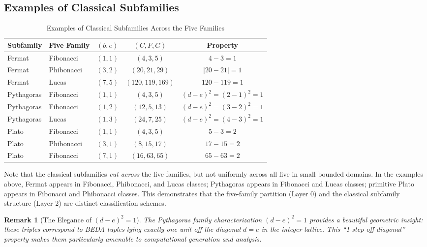 \documentclass[12pt]{article}
\newtheorem{remark}{Remark}
\begin{document}
\subsection{Examples of Classical Subfamilies}

\begin{table}[h!]
\centering
\caption{Examples of Classical Subfamilies Across the Five Families}
\label{tab:classical_examples}
\small
\begin{tabular}{llccc}
\toprule
\textbf{Subfamily} & \textbf{Five Family} & \textbf{$(b,e)$} & \textbf{$(C,F,G)$} & \textbf{Property} \\
\midrule
Fermat & Fibonacci & $(1,1)$ & $(4,3,5)$ & $4-3=1$ \\
Fermat & Phibonacci & $(3,2)$ & $(20,21,29)$ & $|20-21|=1$ \\
Fermat & Lucas & $(7,5)$ & $(120,119,169)$ & $120-119=1$ \\
Pythagoras & Fibonacci & $(1,1)$ & $(4,3,5)$ & $(d-e)^2=(2-1)^2=1$ \\
Pythagoras & Fibonacci & $(1,2)$ & $(12,5,13)$ & $(d-e)^2=(3-2)^2=1$ \\
Pythagoras & Lucas & $(1,3)$ & $(24,7,25)$ & $(d-e)^2=(4-3)^2=1$ \\
Plato & Fibonacci & $(1,1)$ & $(4,3,5)$ & $5-3=2$ \\
Plato & Phibonacci & $(3,1)$ & $(8,15,17)$ & $17-15=2$ \\
Plato & Fibonacci & $(7,1)$ & $(16,63,65)$ & $65-63=2$ \\
\bottomrule
\end{tabular}
\end{table}

Note that the classical subfamilies \emph{cut across} the five families, but not uniformly across all five in small bounded domains. In the examples above, Fermat appears in Fibonacci, Phibonacci, and Lucas classes; Pythagoras appears in Fibonacci and Lucas classes; primitive Plato appears in Fibonacci and Phibonacci classes. This demonstrates that the five-family partition (Layer 0) and the classical subfamily structure (Layer 2) are distinct classification schemes.

\begin{remark}[The Elegance of $(d-e)^2=1$]
The Pythagoras family characterization $(d-e)^2 = 1$ provides a beautiful geometric insight: these triples correspond to BEDA tuples lying exactly one unit off the diagonal $d = e$ in the integer lattice. This ``1-step-off-diagonal'' property makes them particularly amenable to computational generation and analysis.
\end{remark}
\end{document}
